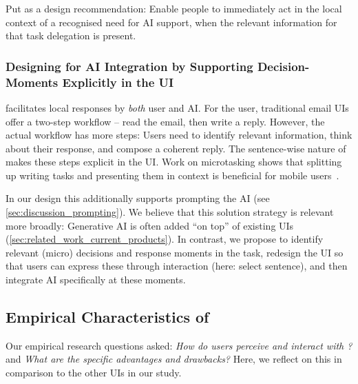 Put as a design recommendation: Enable people to immediately act in the local context of a recognised need for AI support, when the relevant information for that task delegation is present. %







\subsubsection{Designing for AI Integration by Supporting Decision-Moments Explicitly in the UI} 
\modeours{} facilitates local responses by \textit{both} user and AI. 
For the user, traditional email UIs offer a two-step workflow -- read the email, then write a reply. However, the actual workflow has more steps: Users need to identify relevant information, think about their response, and compose a coherent reply. The sentence-wise nature of \modeours{} makes these steps explicit in the UI. Work on microtasking shows that splitting up writing tasks and presenting them in context is beneficial for mobile users~\cite{august2020microwriting, iqbal2018playwrite}.

In our design this additionally supports prompting the AI (see \cref{sec:discussion_prompting}).
We believe that this solution strategy is relevant more broadly: Generative AI is often added ``on top'' of existing UIs (\cref{sec:related_work_current_products}). In contrast, we propose to identify relevant (micro) decisions and response moments in the task, redesign the UI so that users can express these through interaction (here: select sentence), and then integrate AI specifically at these moments.
















\subsection{Empirical Characteristics of \modeours}\label{sec:discussion_results_overview}

Our empirical research questions asked: \textit{How do users perceive and interact with \modeours?} and \textit{What are the specific advantages and drawbacks?}
Here, we reflect on this in comparison to the other UIs in our study.


